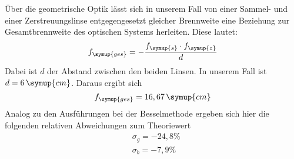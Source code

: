 Über die geometrische Optik lässt sich in unserem Fall von einer Sammel- und einer Zerstreuungslinse
entgegengesetzt gleicher Brennweite eine Beziehung zur Gesamtbrennweite des optischen Systems herleiten.
Diese lautet:
\begin{equation*}
  f_{\symup{ges}} = -\frac{f_{\symup{s}}\cdot f_{\symup{z}}}{d}
\end{equation*}
Dabei ist $d$ der Abstand zwischen den beiden Linsen. In unserem Fall ist $d = 6\,\symup{cm}$.
Daraus ergibt sich
\begin{equation*}
  f_{\symup{ges}} = 16,67\,\symup{cm}
\end{equation*}
Analog zu den Ausführungen bei der Besselmethode ergeben sich hier die folgenden relativen Abweichungen zum Theoriewert
\begin{align*}
  &\sigma_g = -24,8 \% \\
  &\sigma_b = -7,9 \%
\end{align*}
